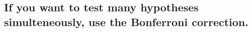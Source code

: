 \documentclass[slidestop,compress,mathserif,12pt,t,professionalfonts,xcolor=table]{beamer}
\newcommand{\mainideaA}{You can use the $F$-test to compare grouping by 2 variables vs. grouping by 1 variable}
\newcommand{\bonferroni}{If you want to test many hypotheses simulteneously, use
  the Bonferroni correction.}
\begin{document}

















\subsection{\bonferroni}
\end{document}
